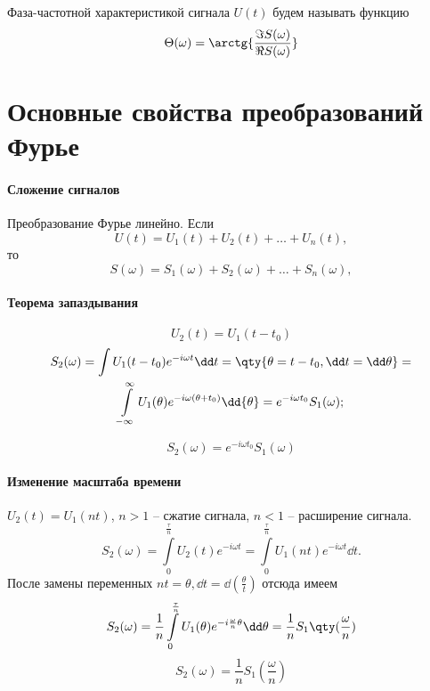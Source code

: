 \documentclass[a4paper,14pt]{extarticle}
\begin{document}
Фаза-частотной характеристикой сигнала $U(t)$ будем называть функцию
\begin{equation}
    \label{eq:}
    \Theta(\omega) = \arctg{\frac{\Im{S(\omega)}}{\Re{S(\omega)}}}
\end{equation}

\section{Основные свойства преобразований Фурье}%
\paragraph{Сложение сигналов}%
Преобразование Фурье линейно.
Если 
\begin{equation}
    \label{eq:}
    U(t) = U_{1}(t) + U_{2}(t) + \dots + U_n(t),
\end{equation}
то 
\begin{equation}
    \label{eq:}
    S(\omega) = S_{1}(\omega) + S_{2}(\omega) + \dots + S_n (\omega),
\end{equation}


\paragraph{Теорема запаздывания}%
\begin{equation}
    \label{eq:}
    U_{2}(t) = U_{1}(t-t_{0})
\end{equation}
\begin{gather}
    \label{eq:}
    S_{2}(\omega) = \int U_1(t - t_{0}) e^{- i \omega t} \dd t =
    \qty{\theta = t -t_{0}, \dd t = \dd \theta} = \\ 
    \int\limits_{-\infty}^{\infty} 
    U_1 (\theta) e^{- i \omega(\theta+t_{0})} \dd{\theta}  = e^{-i\omega t_{0}}
    S_{1}(\omega);
\end{gather}

\begin{equation}
    \label{eq:}
    \boxed{
    S_{2}(\omega) = e^{-i \omega t_{0}} S_{1}(\omega)}
\end{equation}

\paragraph{Изменение масштаба времени}%
$U_2(t) = U_{1}(nt)$, $n>1$ -- сжатие сигнала, $n<1$ -- расширение сигнала.
\begin{equation}
    \label{eq:}
    S_{2} (\omega) = \int\limits_{0}^{\frac{\tau}{n}} U_{2}(t) e^{-i\omega t}
    = \int\limits_{0}^{\frac{\tau}{n}}  U_{1}(nt) e^{-i \omega t} \dd t.
\end{equation}
После замены переменных $nt = \theta, \dd t = \dd(\frac{\theta}{t})$
 отсюда имеем
\begin{equation}
    \label{eq:}
    S_{2}(\omega) = \frac{1}{n} \int\limits_{0}^{\frac{\tau}{n}}  
    U_{1}(\theta) e^{-i \frac{\omega}{n} \theta} \dd \theta = \frac{1}{n}
    S_1\qty(\frac{\omega}{n})
\end{equation}
\begin{equation}
    \label{eq:}
    \boxed{
        S_{2}(\omega) = \frac{1}{n} S_{1}(\frac{\omega}{n})
    }
\end{equation}
\end{document}
